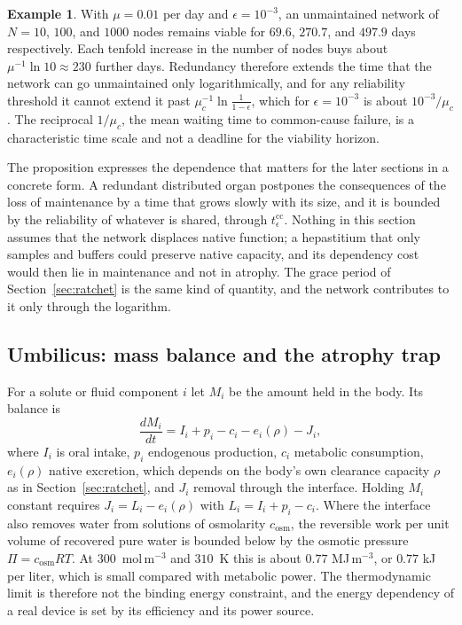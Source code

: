 \documentclass[11pt]{article}
\theoremstyle{plain}
\theoremstyle{definition}
\newtheorem{example}{Example}
\theoremstyle{remark}
\begin{document}
\begin{example}
With $\mu=0.01$ per day and $\epsilon=10^{-3}$, an unmaintained network of $N=10$, $100$, and $1000$ nodes remains viable for $69.6$, $270.7$, and $497.9$ days respectively. Each tenfold increase in the number of nodes buys about $\mu^{-1}\ln10\approx230$ further days. Redundancy therefore extends the time that the network can go unmaintained only logarithmically, and for any reliability threshold it cannot extend it past $\mu_c^{-1}\ln\frac1{1-\epsilon}$, which for $\epsilon=10^{-3}$ is about $10^{-3}/\mu_c$. The reciprocal $1/\mu_c$, the mean waiting time to common-cause failure, is a characteristic time scale and not a deadline for the viability horizon.
\end{example}

The proposition expresses the dependence that matters for the later sections in a concrete form. A redundant distributed organ postpones the consequences of the loss of maintenance by a time that grows slowly with its size, and it is bounded by the reliability of whatever is shared, through $t_\epsilon^{\mathrm{cc}}$. Nothing in this section assumes that the network displaces native function; a hepastitium that only samples and buffers could preserve native capacity, and its dependency cost would then lie in maintenance and not in atrophy. The grace period of Section~\ref{sec:ratchet} is the same kind of quantity, and the network contributes to it only through the logarithm.

\subsection{Umbilicus: mass balance and the atrophy trap}

For a solute or fluid component $i$ let $M_i$ be the amount held in the body. Its balance is
\begin{equation}\label{eq:massbalance}
\frac{dM_i}{dt}=I_i+p_i-c_i-e_i(\rho)-J_i,
\end{equation}
where $I_i$ is oral intake, $p_i$ endogenous production, $c_i$ metabolic consumption, $e_i(\rho)$ native excretion, which depends on the body's own clearance capacity $\rho$ as in Section~\ref{sec:ratchet}, and $J_i$ removal through the interface. Holding $M_i$ constant requires $J_i=L_i-e_i(\rho)$ with $L_i=I_i+p_i-c_i$. Where the interface also removes water from solutions of osmolarity $c_{\mathrm{osm}}$, the reversible work per unit volume of recovered pure water is bounded below by the osmotic pressure $\Pi=c_{\mathrm{osm}}RT$. At $300$~mol\,m$^{-3}$ and $310$~K this is about $0.77$ MJ\,m$^{-3}$, or $0.77$ kJ per liter, which is small compared with metabolic power. The thermodynamic limit is therefore not the binding energy constraint, and the energy dependency of a real device is set by its efficiency and its power source.
\end{document}

